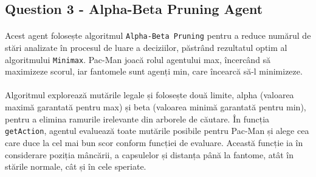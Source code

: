 \documentclass[12pt]{article}
\begin{document}
	\subsection{Question 3 - Alpha-Beta Pruning Agent}
	\paragraph{}Acest agent folosește algoritmul \texttt{Alpha-Beta Pruning} pentru a reduce numărul de stări analizate în procesul de luare a deciziilor, păstrând rezultatul optim al algoritmului \texttt{Minimax}. Pac-Man joacă rolul agentului max, încercând să maximizeze scorul, iar fantomele sunt agenți min, care încearcă să-l minimizeze.

\paragraph{}Algoritmul explorează mutările legale și folosește două limite, alpha (valoarea maximă garantată pentru max) și beta (valoarea minimă garantată pentru min), pentru a elimina ramurile irelevante din arborele de căutare. În funcția \texttt{getAction}, agentul evaluează toate mutările posibile pentru Pac-Man și alege cea care duce la cel mai bun scor conform funcției de evaluare. Această funcție ia în considerare poziția mâncării, a capsulelor și distanța până la fantome, atât în stările normale, cât și în cele speriate.
\end{document}
